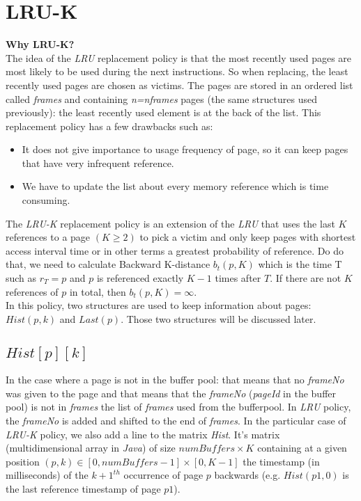 \documentclass{article}
\begin{document}
\section{LRU-K}
\textbf{Why LRU-K?}\\
The idea of the \textit{LRU} replacement policy is that the most recently used pages are most likely to be used during the next instructions. So when replacing, the least recently used pages are chosen as victims. The pages are stored in an ordered list called \textit{frames} and containing \textit{n=nframes} pages (the same structures used previously): the least recently used element is at the back of the list. This replacement policy has a few drawbacks such as:
\begin{itemize}
	\item It does not give importance to usage frequency of page, so it can keep pages that have very infrequent reference.
	\item We have to update the list about every memory reference which is time consuming.
\end{itemize}
The \textit{LRU-K} replacement policy is an extension of the \textit{LRU} that uses the last $K$ references to a page $(K\geq2)$ to pick a victim and only keep pages with shortest access interval time or in other terms a greatest probability of reference. Do do that, we need to calculate Backward K-distance $b_t(p,K)$ which is the time T such as $r_T=p$ and $p$ is referenced exactly $K-1$ times after $T$. If there are not $K$ references of $p$ in total, then $b_t(p,K)=\infty$.\\
In this policy, two structures are used to keep information about pages: $Hist(p,k)$ and $Last(p)$. Those two structures will be discussed later\citep{O'Neil1993}.

\subsection{$Hist[p][k]$}

In the case where a page is not in the buffer pool: that means that no \textit{frameNo} was given to the page and that means that the \textit{frameNo} (\textit{pageId} in the buffer pool) is not in \textit{frames} the list of \textit{frames} used from the bufferpool. In \textit{LRU} policy, the \textit{frameNo} is added and shifted to the end of \textit{frames}. In the particular case of \textit{LRU-K} policy, we also add a line to the matrix \textit{Hist}. It's matrix (multidimensional array in \textit{Java}) of size $numBuffers \times K$ containing at a given position $(p,k) \in [0,numBuffers-1]\times[0,K-1]$ the timestamp (in milliseconds) of the ${k+1}^{th}$ occurrence of page $p$ backwards (e.g. $Hist(p1,0)$ is the last reference timestamp of page $p1$).
\end{document}
